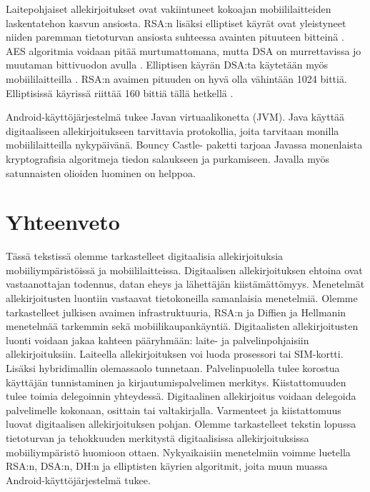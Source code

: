 \documentclass[finnish]{tktltiki2}
\theoremstyle{definition}
\theoremstyle{remark}
\begin{document}
Laitepohjaiset allekirjoitukset ovat vakiintuneet kokoajan mobiililaitteiden laskentatehon kasvun ansiosta. RSA:n lisäksi elliptiset käyrät ovat yleistyneet niiden paremman tietoturvan ansiosta suhteessa avainten pituuteen bitteinä \cite{ECC}. AES algoritmia voidaan pitää murtumattomana, mutta DSA on murrettavissa jo muutaman bittivuodon avulla \cite{gsm}. Elliptisen käyrän DSA:ta käytetään myös mobiililaitteilla \cite{webs}. RSA:n avaimen pituuden on hyvä olla vähintään 1024 bittiä. Elliptisissä käyrissä riittää 160 bittiä tällä hetkellä \cite{ECC}.

Android-käyttöjärjestelmä tukee Javan virtuaalikonetta (JVM). Java käyttää digitaaliseen allekirjoitukseen tarvittavia protokollia, joita tarvitaan monilla mobiililaitteilla nykypäivänä. Bouncy Castle- paketti tarjoaa Javassa monenlaista kryptografisia algoritmeja tiedon salaukseen ja purkamiseen. Javalla myös satunnaisten olioiden luominen on helppoa. \cite{enti}   

\section{Yhteenveto}  

Tässä tekstissä olemme tarkastelleet digitaalisia allekirjoituksia mobiiliympäristöissä ja mobiililaitteissa. Digitaalisen allekirjoituksen ehtoina ovat vastaanottajan todennus, datan eheys ja lähettäjän kiistämättömyys. Menetelmät allekirjoitusten luontiin vastaavat tietokoneilla samanlaisia menetelmiä. Olemme tarkastelleet julkisen avaimen infrastruktuuria, RSA:n ja Diffien ja Hellmanin menetelmää tarkemmin sekä mobiilikaupankäyntiä. Digitaalisten allekirjoitusten luonti voidaan jakaa kahteen pääryhmään: laite- ja palvelinpohjaisiin allekirjoituksiin. Laiteella allekirjoituksen voi luoda prosessori tai SIM-kortti. Lisäksi hybridimallin olemassaolo tunnetaan. Palvelinpuolella tulee korostua käyttäjän tunnistaminen ja kirjautumispalvelimen merkitys. Kiistattomuuden tulee toimia delegoinnin yhteydessä. Digitaalinen allekirjoitus voidaan delegoida palvelimelle kokonaan, osittain tai valtakirjalla. Varmenteet ja kiistattomuus luovat digitaalisen allekirjoituksen pohjan. Olemme tarkastelleet tekstin lopussa tietoturvan ja tehokkuuden merkitystä digitaalisissa allekirjoituksissa mobiiliympäristö huomioon ottaen. Nykyaikaisiin menetelmiin voimme luetella RSA:n, DSA:n, DH:n ja elliptisten käyrien algoritmit, joita muun muassa Android-käyttöjärjestelmä tukee.


%
%
%

\newpage






 
\end{document}
